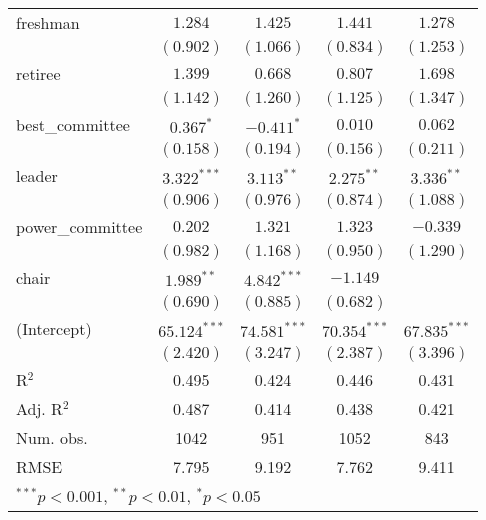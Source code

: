 \documentclass[12pt]{article}
\begin{document}
\begin{table}[H]
\begin{center}
\begin{tabular}{l c c c c }
				freshman               & $1.284$        & $1.425$         & $1.441$        & $1.278$        \\
				& $(0.902)$      & $(1.066)$       & $(0.834)$      & $(1.253)$      \\
				retiree                & $1.399$        & $0.668$         & $0.807$        & $1.698$        \\
				& $(1.142)$      & $(1.260)$       & $(1.125)$      & $(1.347)$      \\
				best\_committee        & $0.367^{*}$    & $-0.411^{*}$    & $0.010$        & $0.062$        \\
				& $(0.158)$      & $(0.194)$       & $(0.156)$      & $(0.211)$      \\
				leader                 & $3.322^{***}$  & $3.113^{**}$    & $2.275^{**}$   & $3.336^{**}$   \\
				& $(0.906)$      & $(0.976)$       & $(0.874)$      & $(1.088)$      \\
				power\_committee       & $0.202$        & $1.321$         & $1.323$        & $-0.339$       \\
				& $(0.982)$      & $(1.168)$       & $(0.950)$      & $(1.290)$      \\
				chair                  & $1.989^{**}$   & $4.842^{***}$   & $-1.149$       &                \\
				& $(0.690)$      & $(0.885)$       & $(0.682)$      &                \\
				(Intercept)            & $65.124^{***}$ & $74.581^{***}$  & $70.354^{***}$ & $67.835^{***}$ \\
				& $(2.420)$      & $(3.247)$       & $(2.387)$      & $(3.396)$      \\
				\hline
				R$^2$                  & 0.495          & 0.424           & 0.446          & 0.431          \\
				Adj. R$^2$             & 0.487          & 0.414           & 0.438          & 0.421          \\
				Num. obs.              & 1042           & 951             & 1052           & 843            \\
				RMSE                   & 7.795          & 9.192           & 7.762          & 9.411          \\
				\hline
				\multicolumn{5}{l}{\scriptsize{$^{***}p<0.001$, $^{**}p<0.01$, $^*p<0.05$}}
			\end{tabular}
		\end{center}
\end{table}
\end{document}
